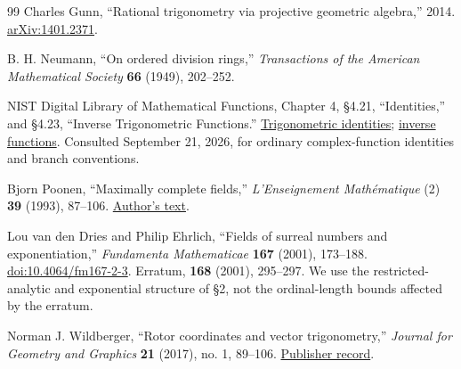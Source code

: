 \documentclass[11pt,letterpaper]{article}
\theoremstyle{definition}
\theoremstyle{remark}
\numberwithin{equation}{section}
\begin{document}
\begin{thebibliography}{99}
Charles Gunn,
``Rational trigonometry via projective geometric algebra,'' 2014.
\href{https://arxiv.org/abs/1401.2371}{arXiv:1401.2371}.

B. H. Neumann,
``On ordered division rings,''
\emph{Transactions of the American Mathematical Society} \textbf{66} (1949), 202--252.

NIST Digital Library of Mathematical Functions,
Chapter 4, \S4.21, ``Identities,'' and \S4.23, ``Inverse Trigonometric Functions.''
\href{https://dlmf.nist.gov/4.21}{Trigonometric identities};
\href{https://dlmf.nist.gov/4.23}{inverse functions}.
Consulted September 21, 2026, for ordinary complex-function identities and branch conventions.

Bjorn Poonen,
``Maximally complete fields,''
\emph{L'Enseignement Math\'ematique} (2) \textbf{39} (1993), 87--106.
\href{https://math.mit.edu/~poonen/papers/amsval.pdf}{Author's text}.

Lou van den Dries and Philip Ehrlich,
``Fields of surreal numbers and exponentiation,''
\emph{Fundamenta Mathematicae} \textbf{167} (2001), 173--188.
\href{https://doi.org/10.4064/fm167-2-3}{doi:10.4064/fm167-2-3}.
Erratum, \textbf{168} (2001), 295--297.
We use the restricted-analytic and exponential structure of \S2, not the ordinal-length bounds affected by the erratum.

Norman J. Wildberger,
``Rotor coordinates and vector trigonometry,''
\emph{Journal for Geometry and Graphics} \textbf{21} (2017), no. 1, 89--106.
\href{https://www.heldermann.de/JGG/JGG21/JGG211/jgg21009.htm}{Publisher record}.

\end{thebibliography}
\end{document}

